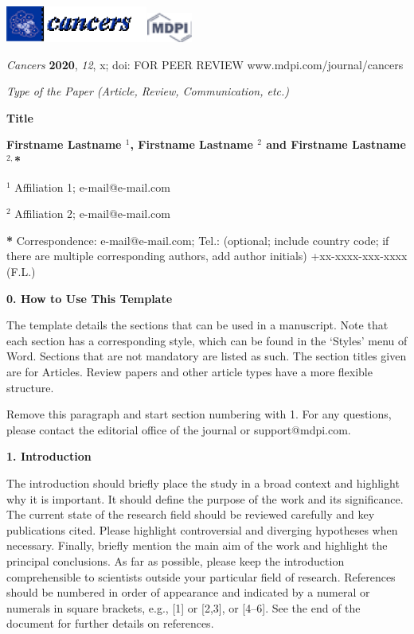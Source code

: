 \documentclass{article} %
\begin{document}
\noindent \textit{\includegraphics*[width=1.84in, height=0.47in, keepaspectratio=false]{image1}\includegraphics*[width=0.59in, height=0.39in, keepaspectratio=false]{image2}}

\noindent \textit{Cancers }\textbf{2020}, \textit{12}, x; doi: FOR PEER REVIEW www.mdpi.com/journal/cancers

\noindent \textit{Type of the Paper (Article, Review, Communication, etc.)}

\noindent \textbf{Title}

\noindent \textbf{Firstname Lastname ${}^{1}$, Firstname Lastname ${}^{2}$ and Firstname Lastname ${}^{2,}$*}

\noindent ${}^{1}$ Affiliation 1; e-mail@e-mail.com

\noindent ${}^{2}$ Affiliation 2; e-mail@e-mail.com

\noindent \textbf{*} Correspondence: e-mail@e-mail.com; Tel.: (optional; include country code; if there are multiple corresponding authors, add author initials) +xx-xxxx-xxx-xxxx (F.L.)



\noindent 

\noindent \textbf{0. How to Use This Template}

The template details the sections that can be used in a manuscript. Note that each section has a corresponding style, which can be found in the `Styles' menu of Word. Sections that are not mandatory are listed as such. The section titles given are for Articles. Review papers and other article types have a more flexible structure. 

Remove this paragraph and start section numbering with 1. For any questions, please contact the editorial office of the journal or support@mdpi.com.

\noindent \textbf{1. Introduction}

The introduction should briefly place the study in a broad context and highlight why it is important. It should define the purpose of the work and its significance. The current state of the research field should be reviewed carefully and key publications cited. Please highlight controversial and diverging hypotheses when necessary. Finally, briefly mention the main aim of the work and highlight the principal conclusions. As far as possible, please keep the introduction comprehensible to scientists outside your particular field of research. References should be numbered in order of appearance and indicated by a numeral or numerals in square brackets, e.g., [1] or [2,3], or [4--6]. See the end of the document for further details on references.
\end{document}
